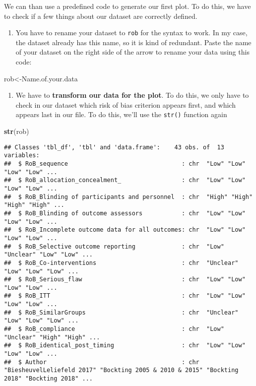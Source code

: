 \documentclass[]{book}
\newenvironment{Shaded}{\begin{snugshade}}{\end{snugshade}}
\newcommand{\KeywordTok}[1]{\textcolor[rgb]{0.13,0.29,0.53}{\textbf{#1}}}
\newcommand{\NormalTok}[1]{#1}
\providecommand{\tightlist}{%
  \setlength{\itemsep}{0pt}\setlength{\parskip}{0pt}}
\theoremstyle{definition}
\theoremstyle{definition}
\theoremstyle{definition}
\theoremstyle{remark}
\begin{document}
We can than use a predefined code to generate our first plot. To do
this, we have to check if a few things about our dataset are correctly
defined.

\begin{enumerate}
\def\labelenumi{\arabic{enumi}.}
\tightlist
\item
  You have to rename your dataset to \texttt{rob} for the syntax to
  work. In my case, the dataset already has this name, so it is kind of
  redundant. Paste the name of your dataset on the right side of the
  arrow to rename your data using this code:
\end{enumerate}

\begin{Shaded}
\begin{Highlighting}[]
\NormalTok{rob<-Name.of.your.data}
\end{Highlighting}
\end{Shaded}

\begin{enumerate}
\def\labelenumi{\arabic{enumi}.}
\setcounter{enumi}{1}
\tightlist
\item
  We have to \textbf{transform our data for the plot}. To do this, we
  only have to check in our dataset which risk of bias criterion appears
  first, and which appears last in our file. To do this, we'll use the
  \texttt{str()} function again
\end{enumerate}

\begin{Shaded}
\begin{Highlighting}[]
\KeywordTok{str}\NormalTok{(rob)}
\end{Highlighting}
\end{Shaded}

\begin{verbatim}
## Classes 'tbl_df', 'tbl' and 'data.frame':    43 obs. of  13 variables:
##  $ RoB_sequence                                : chr  "Low" "Low" "Low" "Low" ...
##  $ RoB_allocation_concealment_                 : chr  "Low" "Low" "Low" "Low" ...
##  $ RoB_Blinding of participants and personnel  : chr  "High" "High" "High" "High" ...
##  $ RoB_Blinding of outcome assessors           : chr  "Low" "Low" "Low" "Low" ...
##  $ RoB_Incomplete outcome data for all outcomes: chr  "Low" "Low" "Low" "Low" ...
##  $ RoB_Selective outcome reporting             : chr  "Low" "Unclear" "Low" "Low" ...
##  $ RoB_Co-interventions                        : chr  "Unclear" "Low" "Low" "Low" ...
##  $ RoB_Serious_flaw                            : chr  "Low" "Low" "Low" "Low" ...
##  $ RoB_ITT                                     : chr  "Low" "Low" "Low" "Low" ...
##  $ RoB_SimilarGroups                           : chr  "Unclear" "Low" "Low" "Low" ...
##  $ RoB_compliance                              : chr  "Low" "Unclear" "High" "High" ...
##  $ RoB_identical_post_timing                   : chr  "Low" "Low" "Low" "Low" ...
##  $ Author                                      : chr  "BiesheuvelLeliefeld 2017" "Bockting 2005 & 2010 & 2015" "Bockting 2018" "Bockting 2018" ...
\end{verbatim}
\end{document}
